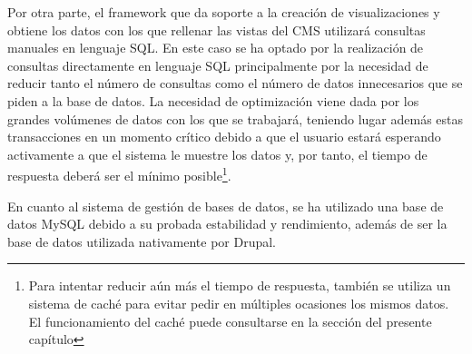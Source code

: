 Por otra parte, el framework que da soporte a la creación de visualizaciones y obtiene los datos con los que rellenar las vistas del CMS utilizará consultas manuales en lenguaje SQL.  En este caso se ha optado por la realización de consultas directamente en lenguaje SQL principalmente por la necesidad de reducir tanto el número de consultas como el número de datos innecesarios que se piden a la base de datos.  La necesidad de optimización viene dada por los grandes volúmenes de datos con los que se trabajará, teniendo lugar además estas transacciones en un momento crítico debido a que el usuario estará esperando activamente a que el sistema le muestre los datos y, por tanto, el tiempo de respuesta deberá ser el mínimo posible\footnote{Para intentar reducir aún más el tiempo de respuesta, también se utiliza un sistema de caché para evitar pedir en múltiples ocasiones los mismos datos.  El funcionamiento del caché puede consultarse en la sección  del presente capítulo}.

En cuanto al sistema de gestión de bases de datos, se ha utilizado una base de datos MySQL debido a su probada estabilidad y rendimiento, además de ser la base de datos utilizada nativamente por Drupal.
